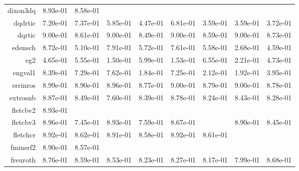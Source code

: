 \begin{tabular}{rrrrrrrrr}
  dixon3dq &  8.93e-01 &  8.58e-01 & \cellcolor{black}{\color{white}{ 8.93e-01}} & \cellcolor{black}{\color{white}{ 8.56e-01}} & \cellcolor{black}{\color{white}{ 8.93e-01}} & \cellcolor{black}{\color{white}{ 8.57e-01}} & \cellcolor{black}{\color{white}{ 8.94e-01}} & \cellcolor{black}{\color{white}{ 8.63e-01}} \\
  dqdrtic &  7.20e-01 &  7.37e-01 &  5.85e-01 &  4.47e-01 &  6.81e-01 &  3.59e-01 &  3.59e-01 &  3.72e-01 \\
  dqrtic &  9.00e-01 &  8.61e-01 &  9.00e-01 &  8.49e-01 &  9.00e-01 &  8.59e-01 &  9.00e-01 &  8.73e-01 \\
  edensch &  8.72e-01 &  5.10e-01 &  7.91e-01 &  5.72e-01 &  7.61e-01 &  5.58e-01 &  2.68e-01 &  4.59e-01 \\
  eg2 &  4.65e-01 &  5.55e-01 &  1.50e-01 &  5.99e-01 &  1.53e-01 &  6.55e-01 &  2.21e-01 &  4.73e-01 \\
  engval1 &  8.39e-01 &  7.29e-01 &  7.62e-01 &  1.84e-01 &  7.25e-01 &  2.12e-01 &  1.92e-01 &  3.95e-01 \\
  errinros &  8.99e-01 &  8.90e-01 &  8.96e-01 &  8.77e-01 &  9.00e-01 &  8.79e-01 &  9.00e-01 &  8.78e-01 \\
  extrosnb &  8.87e-01 &  8.49e-01 &  7.60e-01 &  8.39e-01 &  8.78e-01 &  8.24e-01 &  8.43e-01 &  8.28e-01 \\
  fletcbv2 &  8.93e-01 & \cellcolor{black}{\color{white}{ 8.57e-01}} & \cellcolor{black}{\color{white}{ 8.92e-01}} & \cellcolor{black}{\color{white}{ 8.56e-01}} & \cellcolor{black}{\color{white}{ 8.93e-01}} & \cellcolor{black}{\color{white}{ 8.58e-01}} & \cellcolor{black}{\color{white}{ 8.93e-01}} & \cellcolor{black}{\color{white}{ 8.61e-01}} \\
  fletcbv3 &  8.96e-01 &  7.45e-01 &  8.93e-01 &  7.59e-01 &  8.67e-01 & \cellcolor{black}{\color{white}{ 4.10e-01}} &  8.90e-01 &  8.45e-01 \\
  fletchcr &  8.92e-01 &  8.62e-01 &  8.91e-01 &  8.58e-01 &  8.92e-01 &  8.61e-01 & \cellcolor{black}{\color{white}{ 8.93e-01}} & \cellcolor{black}{\color{white}{ 8.95e-01}} \\
  fminsrf2 &  8.90e-01 &  8.57e-01 & \cellcolor{black}{\color{white}{ 8.92e-01}} & \cellcolor{black}{\color{white}{ 8.57e-01}} & \cellcolor{black}{\color{white}{ 8.91e-01}} & \cellcolor{black}{\color{white}{ 8.56e-01}} & \cellcolor{black}{\color{white}{ 8.91e-01}} & \cellcolor{black}{\color{white}{ 8.60e-01}} \\
  freuroth &  8.76e-01 &  8.59e-01 &  8.53e-01 &  8.23e-01 &  8.27e-01 &  8.17e-01 &  7.99e-01 &  8.68e-01 \\

\end{tabular}
